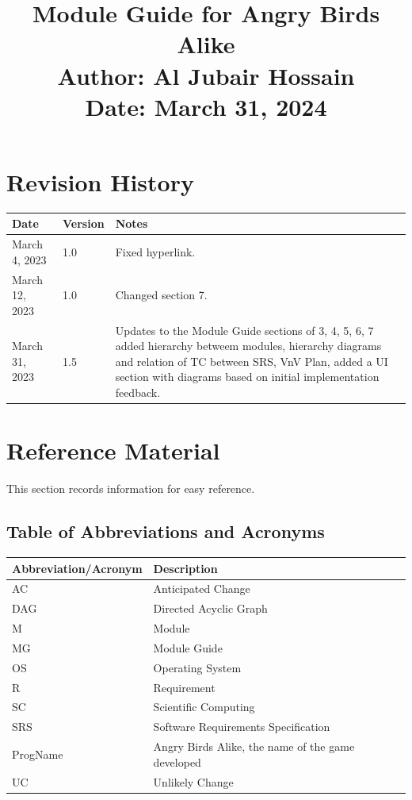 \documentclass[12pt]{article}
\title{
    {\Huge Module Guide for Angry Birds Alike} \\
    {\Large Author: Al Jubair Hossain} \\
    {\large Date: March 31, 2024}
}
\date{}
\begin{document}
\maketitle

\newpage

\section*{Revision History}
\begin{longtable}{|p{2cm}|p{2cm}|p{10cm}|}
    \hline
    \textbf{Date} & \textbf{Version} & \textbf{Notes} \\
    \hline
    March 4, 2023 & 1.0 & Fixed hyperlink. \\\hline
    March 12, 2023 & 1.0 & Changed section 7. \\\hline
    March 31, 2023 & 1.5 & Updates to the Module Guide sections of 3, 4, 5, 6, 7 added hierarchy betweem modules, hierarchy diagrams and relation of TC between SRS, VnV Plan, added a UI section with diagrams based on initial implementation feedback. \\
    \hline
\end{longtable}

\newpage

\tableofcontents

\newpage

\section{Reference Material}
This section records information for easy reference.

\subsection{Table of Abbreviations and Acronyms}
\begin{longtable}{|l|l|}
    \hline
    \textbf{Abbreviation/Acronym} & \textbf{Description} \\
    \hline
    AC & Anticipated Change \\
    DAG & Directed Acyclic Graph \\
    M & Module \\
    MG & Module Guide \\
    OS & Operating System \\
    R & Requirement \\
    SC & Scientific Computing \\
    SRS & Software Requirements Specification \\
    ProgName & Angry Birds Alike, the name of the game developed \\
    UC & Unlikely Change \\
    \hline
\end{longtable}
\end{document}

